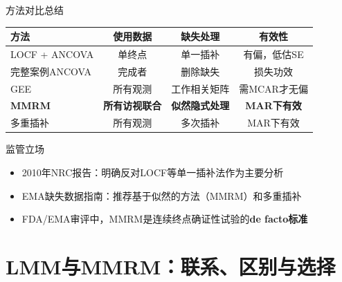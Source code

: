 \documentclass[aspectratio=169,11pt]{beamer}
\begin{document}
\begin{frame}{方法对比总结}
\begin{center}
\small
\begin{tabular}{lccc}
\toprule
\textbf{方法} & \textbf{使用数据} & \textbf{缺失处理} & \textbf{有效性} \\
\midrule
LOCF + ANCOVA & 单终点 & 单一插补 & \textcolor{warnred}{有偏，低估SE} \\
完整案例ANCOVA & 完成者 & 删除缺失 & \textcolor{warnred}{损失功效} \\
GEE & 所有观测 & 工作相关矩阵 & 需MCAR才无偏 \\
\textbf{MMRM} & \textbf{所有访视联合} & \textbf{似然隐式处理} & \textcolor{accentgreen}{\textbf{MAR下有效}} \\
多重插补 & 所有观测 & 多次插补 & MAR下有效 \\
\bottomrule
\end{tabular}
\end{center}

\vspace{0.2cm}
\begin{alertblock}{监管立场}
\begin{itemize}
    \item 2010年NRC报告：明确反对LOCF等单一插补法作为主要分析
    \item EMA缺失数据指南：推荐基于似然的方法（MMRM）和多重插补
    \item FDA/EMA审评中，MMRM是连续终点确证性试验的\textbf{de facto标准}
\end{itemize}
\end{alertblock}
\end{frame}

\section{LMM与MMRM：联系、区别与选择}
\end{document}

